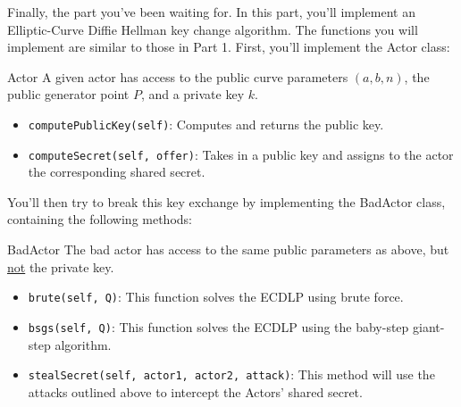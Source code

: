 \documentclass{article}
\begin{document}
\begin{tcolorbox}[enhanced,interior style={top color=Plum!20,bottom color=Plum!40}]
    Finally, the part you've been waiting for. In this part, you'll implement an Elliptic-Curve Diffie Hellman key change algorithm. The functions you will implement are similar to those in Part 1. First, you'll implement the Actor class:

    \begin{mybox}[
        colframe=Cerulean!50!black,
        colback=Cerulean!30,
        colbacktitle=Cerulean!,
        coltitle=Cerulean!30!black
        ]{Actor}
        A given actor has access to the public curve parameters $(a, b, n)$, the public generator point $P$, and a private key $k$.
        \begin{itemize}
            \item \lstinline{computePublicKey(self)}: Computes and returns the public key.
            \item \lstinline{computeSecret(self, offer)}: Takes in a public key and assigns to the actor the corresponding shared secret.
        \end{itemize}

    \end{mybox}

    You'll then try to break this key exchange by implementing the BadActor class, containing the following methods:

    \begin{mybox}[
        colframe=purple!50!black,
        colback=purple!40,
        colbacktitle=purple!50!white,
        coltitle=purple!30!black,
        ]{BadActor}
        The bad actor has access to the same public parameters as above, but \underline{not} the private key.
        \begin{itemize}
            \item \lstinline{brute(self, Q)}: This function solves the ECDLP using brute force.
            \item \lstinline{bsgs(self, Q)}: This function solves the ECDLP using the baby-step giant-step algorithm.
            \item \lstinline{stealSecret(self, actor1, actor2, attack)}: This method will use the attacks outlined above to intercept the Actors' shared secret.
        \end{itemize}
    \end{mybox}
\end{tcolorbox}
\end{document}
